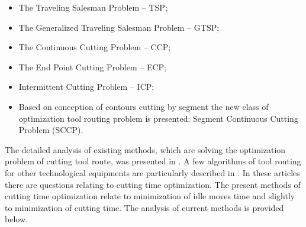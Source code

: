 \documentclass[runningheads]{llncs}
\begin{document}
\begin{itemize}

\item The Traveling Salesman Problem – TSP;

\item The Generalized Traveling Salesman Problem – GTSP;

\item The Continuous Cutting Problem – CCP;

\item The End Point Cutting Problem – ECP;

\item Intermittent Cutting Problem – ICP;

\item Based on conception of contours cutting by segment \cite{Petunin2015Nov}
the new class of optimization tool routing problem is presented:
Segment Continuous Cutting Problem (SCCP).

\end{itemize}

The detailed analysis of existing methods,
which are solving the optimization problem
of cutting tool route, was presented in \cite{Dewil2016Nov}.
A few algorithms of tool routing for other technological equipments
are particularly described in \cite{Grotschel,Ghiani}.
In these articles there are questions relating to
cutting time optimization.
The present methods of cutting time optimization
relate to minimization of idle moves time and
slightly to minimization of cutting time.
The analysis of current methods is provided below.
\end{document}
